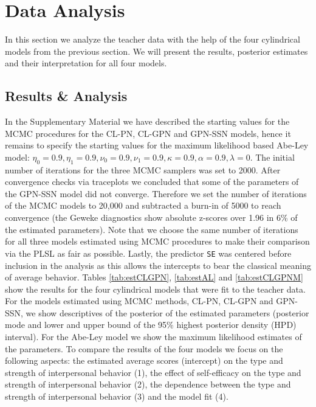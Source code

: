 \documentclass[man]{apa6}
\begin{document}
\section{Data Analysis}\label{DataAnalysis}

In this section we analyze the teacher data with the help of the four
cylindrical models from the previous section. We will present the results,
posterior estimates and their interpretation for all four models.

\subsection{Results \& Analysis}\label{DataResults}

In the Supplementary Material we have described the starting values for the MCMC
procedures for the CL-PN, CL-GPN and GPN-SSN models, hence it remains to specify
the starting values for the maximum likelihood based Abe-Ley model: \(\eta_0 = 0.9, \eta_1 = 0.9, \nu_0 = 0.9, \nu_1 = 0.9, \kappa = 0.9, \alpha = 0.9, \lambda = 0\). The initial number of iterations for the three MCMC samplers was set to
2000. After convergence checks via traceplots we concluded that some of the
parameters of the GPN-SSN model did not converge. Therefore we set the number of
iterations of the MCMC models to 20,000 and subtracted a burn-in of 5000 to
reach convergence (the Geweke diagnostics show absolute z-scores over 1.96 in
6\% of the estimated parameters). Note that we choose the same number of
iterations for all three models estimated using MCMC procedures to make
their comparison via the PLSL as fair as possible. Lastly, the predictor
\verb|SE| was centered before inclusion in the analysis as this allows the
intercepts to bear the classical meaning of average behavior.\newline
\indent Tables \ref{tab:estCLGPN}, \ref{tab:estAL} and \ref{tab:estCLGPNM} show
the results for the four cylindrical models that were fit to the teacher data.
For the models estimated using MCMC methods, CL-PN, CL-GPN and GPN-SSN, we show
descriptives of the posterior of the estimated parameters (posterior mode and
lower and upper bound of the 95\% highest posterior density (HPD) interval). For
the Abe-Ley model we show the maximum likelihood estimates of the parameters. To
compare the results of the four models we focus on the following aspects: the
estimated average scores (intercept) on the type and strength of interpersonal
behavior (1), the effect of self-efficacy on the type and strength of
interpersonal behavior (2), the dependence between the type and strength of
interpersonal behavior (3) and the model fit (4).
\end{document}
